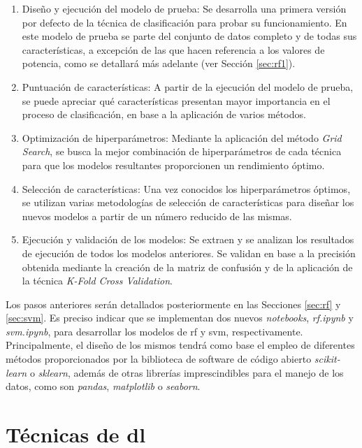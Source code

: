 \begin{enumerate}
    \item Diseño y ejecución del modelo de prueba: Se desarrolla una primera versión por defecto de la técnica de clasificación para probar su funcionamiento. En este modelo de prueba se parte del conjunto de datos completo y de todas sus características, a excepción de las que hacen referencia a los valores de potencia, como se detallará más adelante (ver Sección \ref{sec:rf1}). 
    \item Puntuación de características: A partir de la ejecución del modelo de prueba, se puede apreciar qué características presentan mayor importancia en el proceso de clasificación, en base a la aplicación de varios métodos. 
    \item Optimización de hiperparámetros: Mediante la aplicación del método \textit{Grid Search}, se busca la mejor combinación de hiperparámetros de cada técnica para que los modelos resultantes proporcionen un rendimiento óptimo. 
    \item Selección de características: Una vez conocidos los hiperparámetros óptimos, se utilizan varias metodologías de selección de características para diseñar los nuevos modelos a partir de un número reducido de las mismas.
    \item Ejecución y validación de los modelos: Se extraen y se analizan los resultados de ejecución de todos los modelos anteriores. Se validan en base a la precisión obtenida mediante la creación de la matriz de confusión y de la aplicación de la técnica \textit{K-Fold Cross Validation}.
\end{enumerate}

Los pasos anteriores serán detallados posteriormente en las Secciones \ref{sec:rf} y \ref{sec:svm}. Es preciso indicar que se implementan dos nuevos \textit{notebooks}, \textit{rf.ipynb} y \textit{svm.ipynb}, para desarrollar los modelos de \gls{rf} y \gls{svm}, respectivamente. Principalmente, el diseño de los mismos tendrá como base el empleo de diferentes métodos proporcionados por la biblioteca de software de código abierto \textit{scikit-learn} o \textit{sklearn}, además de otras librerías imprescindibles para el manejo de los datos, como son \textit{pandas}, \textit{matplotlib} o \textit{seaborn}.





\section{Técnicas de \gls{dl}}
\label{sec:tecnicasdl}

